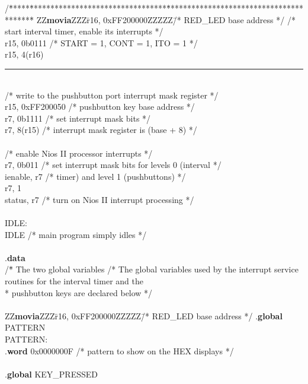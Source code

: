 \begin{center}
\begin{minipage}[t]{12.5 cm}
\begin{tabbing}
/\=*****\=*********************************\=****************************************\=\kill
ZZ\={\bf movia}ZZZ\=r16, 0xFF200000ZZZZZ\=/* RED\_LED base address */\kill
\>/* start interval timer, enable its interrupts */\\
 \>r15, 0b0111 \>/* START = 1, CONT = 1, ITO = 1 */\\
 \>r15, 4(r16)\\
\rule{6.0in}{0in}~\\
\>/* write to the pushbutton port interrupt mask register */\\
 \>r15, 0xFF200050 \>/* pushbutton key base address */\\
 \>r7, 0b1111 \>/* set interrupt mask bits */\\
 \>r7, 8(r15) \>/* interrupt mask register is (base + 8) */\\
~\\
\>/* enable Nios II processor interrupts */\\
 \>r7, 0b011 \>/* set interrupt mask bits for levels 0 (interval */\\
 \>ienable, r7 \>/* timer) and level 1 (pushbuttons) */\\
 \>r7, 1\\
 \>status, r7 \>/* turn on Nios II interrupt processing */\\
~\\
IDLE:\\
 \>IDLE \>/* main program simply idles */\\
~\\
\>.{\bf data}\\
/\=* The two global variables \kill
/* The global variables used by the interrupt service routines for the interval timer and the\\
\>* pushbutton keys are declared below */\\
~\\
ZZ\={\bf movia}ZZZ\=r16, 0xFF200000ZZZZZ\=/* RED\_LED base address */\kill
\>.{\bf global} \>PATTERN\\
PATTERN:\\
\>.{\bf word} \>0x0000000F \>/* pattern to show on the HEX displays */\\
~\\
\>.{\bf global} \>KEY\_PRESSED\\

\end{tabbing}
\end{minipage}
\end{center}
